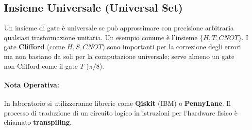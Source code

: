\documentclass[12pt, a4paper]{article}
\begin{document}
\subsection{Insieme Universale (Universal Set)}
Un insieme di gate è universale se può approssimare con precisione arbitraria qualsiasi trasformazione unitaria. Un esempio comune è l'insieme $\{H, T, CNOT\}$. I gate \textbf{Clifford} (come $H, S, CNOT$) sono importanti per la correzione degli errori ma non bastano da soli per la computazione universale; serve almeno un gate non-Clifford come il gate $T$ ($\pi/8$).

\paragraph{Nota Operativa:} In laboratorio si utilizzeranno librerie come \textbf{Qiskit} (IBM) o \textbf{PennyLane}. Il processo di traduzione di un circuito logico in istruzioni per l'hardware fisico è chiamato \textbf{transpiling}.
\end{document}
